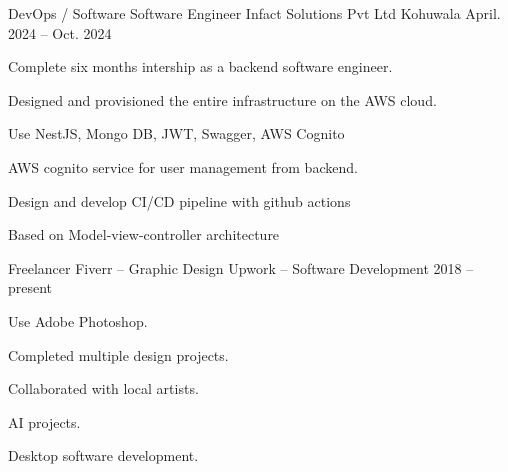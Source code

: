 

\begin{cventries}

  \cventry
    {DevOps / Software Software Engineer} %
    {Infact Solutions Pvt Ltd} %
    {Kohuwala} %
    {April. 2024 -- Oct. 2024} %

    {
      \begin{cvitems} %
        \item {Complete six months intership as a backend software engineer.}
        \item {Designed and provisioned the entire infrastructure on the AWS cloud.}
        \item {Use NestJS, Mongo DB, JWT, Swagger, AWS Cognito}
        \item {AWS cognito service for user management from backend.}
        \item {Design and develop CI/CD pipeline with github actions}
        \item {Based on Model-view-controller architecture}
      \end{cvitems}
    }

  \cventry
    {Freelancer} %
    {Fiverr -- Graphic Design} %
    {Upwork -- Software Development} %
    {2018 -- present} %
    {
      \begin{cvitems} %
        \item {Use Adobe Photoshop.}
        \item {Completed multiple design projects.}
        \item {Collaborated with local artists.}
        \item {AI projects.}
        \item {Desktop software development.}
      \end{cvitems}
    }

\end{cventries}

